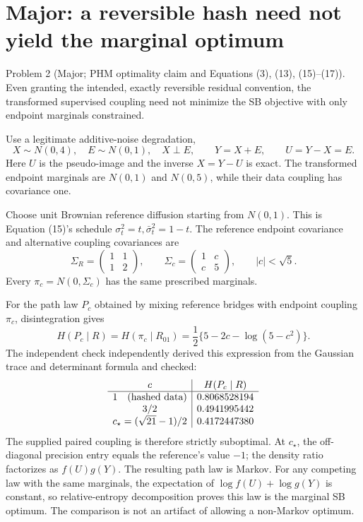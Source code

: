 \documentclass[10pt]{article}
\begin{document}
\section*{Major: a reversible hash need not yield the marginal optimum}
Problem 2 (Major; PHM optimality claim and Equations (3), (13), (15)–(17)).  Even granting the intended, exactly reversible residual convention, the transformed supervised coupling need not minimize the SB objective with only endpoint marginals constrained.\par
Use a legitimate additive-noise degradation, \[X\sim N(0,4),\quad E\sim N(0,1),\quad X\perp E,\qquad
 Y=X+E,\qquad U=Y-X=E.\] Here \(U\) is the pseudo-image and the inverse \(X=Y-U\) is exact. The transformed endpoint marginals are \(N(0,1)\) and \(N(0,5)\), while their data coupling has covariance one.\par
Choose unit Brownian reference diffusion starting from \(N(0,1)\). This is Equation (15)’s schedule \(\sigma_t^2=t,\bar\sigma_t^2=1-t\). The reference endpoint covariance and alternative coupling covariances are \[\Sigma_R=\begin{pmatrix}1&1\\1&2\end{pmatrix},
 \qquad
 \Sigma_c=\begin{pmatrix}1&c\\c&5\end{pmatrix},
 \qquad |c|<\sqrt5.\] Every \(\pi_c=N(0,\Sigma_c)\) has the same prescribed marginals.\par
For the path law \(P_c\) obtained by mixing reference bridges with endpoint coupling \(\pi_c\), disintegration gives \[H(P_c\mid R)=H(\pi_c\mid R_{01})
 =\frac12\{5-2c-\log(5-c^2)\}.\] The independent check independently derived this expression from the Gaussian trace and determinant formula and checked: \[\begin{array}{c|c}
 c& H(P_c\mid R)\\ \hline
 1\quad\hbox{(hashed data)}&0.8068528194\\
 3/2&0.4941995442\\
 c_\star=(\sqrt{21}-1)/2&0.4172447380
 \end{array}\] The supplied paired coupling is therefore strictly suboptimal. At \(c_\star\), the off-diagonal precision entry equals the reference’s value \(-1\); the density ratio factorizes as \(f(U)g(Y)\). The resulting path law is Markov. For any competing law with the same marginals, the expectation of \(\log f(U)+\log g(Y)\) is constant, so relative-entropy decomposition proves this law is the marginal SB optimum. The comparison is not an artifact of allowing a non-Markov optimum.\par
\end{document}
